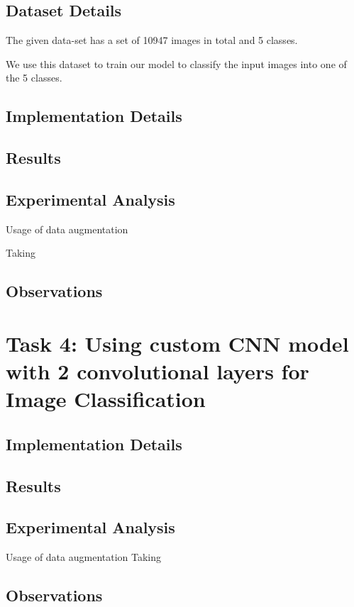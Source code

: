 \documentclass{article}
\begin{document}
\subsection*{Dataset Details}

The given data-set has a set of 10947 images in total and 5 classes.

We use this dataset to train our model to classify the input images into 
one of the 5 classes.

\subsection*{Implementation Details}


\subsection*{Results}



\subsection*{Experimental Analysis}

Usage of data augmentation 

Taking 

\subsection*{Observations}


\section*{Task 4: Using custom CNN model with 2 convolutional layers for Image Classification}

\subsection*{Implementation Details}


\subsection*{Results}

\subsection*{Experimental Analysis}
Usage of data augmentation 
Taking
\subsection*{Observations}
\end{document}
